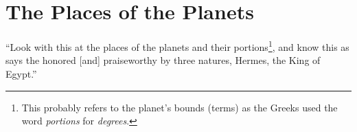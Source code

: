 \section{The Places of the Planets}
``Look with this at the places of the planets and their portions\footnote{This probably refers to the planet's bounds (terms) as the Greeks used the word \textsl{portions} for \textsl{degrees}.}, and know this as says the honored [and] praiseworthy by three natures, Hermes, the King of Egypt.''